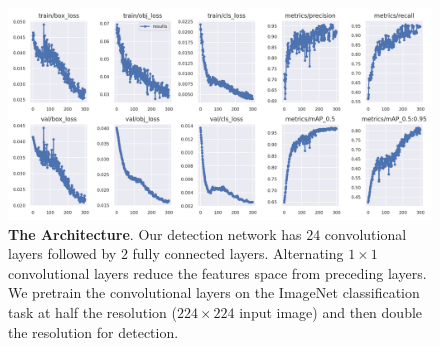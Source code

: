 \begin{figure}[H] %
  \centering
  \includegraphics[width=\textwidth]{figures/paper/yolo-on-coco.png}
  \caption[The Architecture]{\textbf{The Architecture}. Our detection network has $24$ convolutional layers followed by $2$ fully connected layers. Alternating $1 \times 1$ convolutional layers reduce the features space from preceding layers. We pretrain the convolutional layers on the ImageNet classification task at half the resolution ($224 \times 224$ input image) and then double the resolution for detection.}
  \label{fig:figures/paper/yolo-on-coco}
\end{figure}



{}
\specialsection %
\headerspecialsection

{\hypersetup{urlcolor=ntnu,linkcolor=sophia} %

  
}
